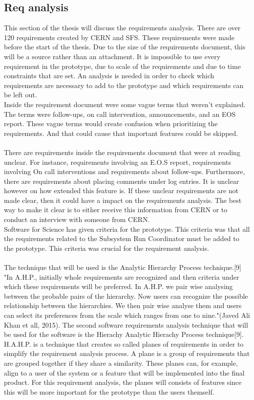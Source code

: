 \documentclass[paper=a4, fontsize=11pt,twoside]{scrartcl}	%
\begin{document}
\subsection{Req analysis}
This section of the thesis will discuss the requirements analysis. There are over 120 requirements created by CERN and SFS. These requirements were made before the start of the thesis. Due to the size of the requirements document, this will be a source rather than an attachment. It is impossible to use every requirement in the prototype, due to scale of the requirements and due to time constraints that are set. An analysis is needed in order to check which requirements are necessary to add to the prototype and which requirements can be left out.  \\
Inside the requirement document were some vague terms that weren't explained. The terms were follow-ups, on call intervention, announcements, and an EOS report. These vague terms would create confusion when prioritizing the requirements. And that could cause that important features could be skipped. \\ \\
There are requirements inside the requirements document that were at reading unclear. For instance, requirements involving an E.O.S report, requirements involving On call interventions and requirements about follow-ups. Furthermore, there are requirements about placing comments under log entries. It is unclear however on how extended this feature is. If these unclear requirements are not made clear, then it could have a impact on the requirements analysis. The best way to make it clear is to either receive this information from CERN or to conduct an interview with someone from CERN. \\ 
Software for Science has given criteria for the prototype. This criteria was that all the requirements related to the Subsystem Run Coordinator must be added to the prototype. This criteria was crucial for the requirement analysis. \\ \\
The technique that will be used is the Analytic Hierarchy Process technique.[9] "In A.H.P., initially whole requirements are recognized and then criteria under which these requirements will be preferred. In A.H.P. we pair wise analysing  between  the  probable  pairs  of  the  hierarchy. 
Now users can recognize the possible relationship between 
the hierarchies. We then pair wise analyse them and users can select its preferences from the scale which ranges from 
one to nine."(Javed Ali Khan et all, 2015). The second software requirements analysis technique that will be used for the software is the Hierachy Analytic Hierachy Process technique[9]. H.A.H.P. is a technique that creates so called planes of requirements in order to simplify the requirement analysis process. A plane is a group of requirements that are grouped together if they share a similarity. These planes can, for example, align to a user of the system or a feature that will be implemented into the final product. For this requirement analysis, the planes will consists of features since this will be more important for the prototype than the users themself. \\ \\
\end{document}
